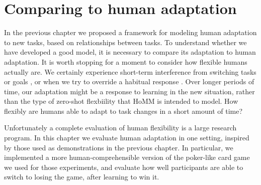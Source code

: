 \chapter{Comparing to human adaptation} \label{chapter:human}

In the previous chapter we proposed a framework for modeling human adaptation to new tasks, based on relationships between tasks. To understand whether we have developed a good model, it is necessary to compare its adaptation to human adaptation. It is worth stopping for a moment to consider how flexible humans actually are. We certainly experience short-term interference from switching tasks or goals \citep{Rogers1995}, or when we try to override a habitual response \citep{Stroop1935, MacLeod1991}. Over longer periods of time, our adaptation might be a response to learning in the new situation, rather than the type of zero-shot flexbiility that HoMM is intended to model. How flexibly are humans able to adapt to task changes in a short amount of time? \par
Unfortunately a complete evaluation of human flexibility is a large research program. In this chapter we evaluate human adaptation in one setting, inspired by those used as demonstrations in the previous chapter. In particular, we implemented a more human-comprehensible version of the poker-like card game we used for those experiments, and evaluate how well participants are able to switch to losing the game, after learning to win it. \par

